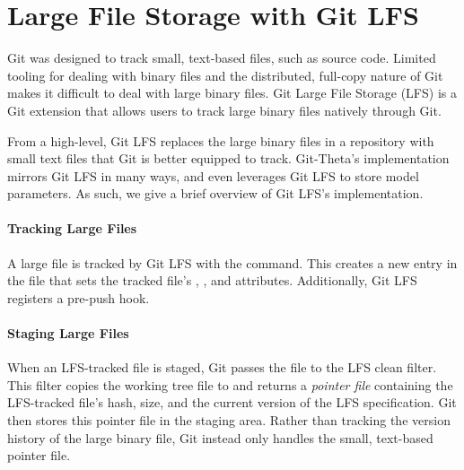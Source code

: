\section{Large File Storage with Git LFS}
Git was designed to track small, text-based files, such as source code. Limited tooling for dealing with binary files and the distributed, full-copy nature of Git makes it difficult to deal with large binary files. Git Large File Storage (LFS) is a Git extension that allows users to track large binary files natively through Git. 

From a high-level, Git LFS replaces the large binary files in a repository with small text files that Git is better equipped to track. Git-Theta's implementation mirrors Git LFS in many ways, and even leverages Git LFS to store model parameters. As such, we give a brief overview of Git LFS's implementation.

\paragraph{Tracking Large Files}
A large file is tracked by Git LFS with the  command. This creates a new entry in the  file that sets the tracked file's , , and  attributes. Additionally, Git LFS registers a pre-push hook.

\paragraph{Staging Large Files}
When an LFS-tracked file is staged, Git passes the file to the LFS clean filter. This filter copies the working tree file to  and returns a \emph{pointer file} containing the LFS-tracked file's hash, size, and the current version of the LFS specification. Git then stores this pointer file in the staging area. Rather than tracking the version history of the large binary file, Git instead only handles the small, text-based pointer file.



